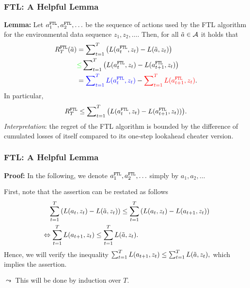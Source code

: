 \begin{frame} 
	\frametitle{FTL: A Helpful Lemma}
	\small
	 \textbf{Lemma:}
		Let $a_1^{\texttt{FTL}}, a_2^{\texttt{FTL}}, \ldots$ be the sequence of actions used by the FTL algorithm for the environmental data sequence $z_1,z_2,\ldots .$
		 Then, for all $\tilde a \in \mathcal{A}$ it holds that 
		\begin{align*}
			R_T^{\FTL}(\tilde a) 
			&= \sum\nolimits_{t=1}^T \left(\l(a_t^{\FTL},z_t) - \l(\tilde a,z_t)\right) \\
%			
			& {\color{green} \leq} \sum\nolimits_{t=1}^T \left(\l(a_t^{\FTL},z_t) - \l(a_{t+1}^{\FTL},z_t)\right)\\
%			
			&= {\color{blue} \sum\nolimits_{t=1}^T \l(a_t^{\FTL},z_t) }-  {\color{red}\sum\nolimits_{t=1}^T  \l(a_{t+1}^{\FTL},z_t)}.
		\end{align*}
		 In particular,
		\begin{equation*}
			R_T^{\texttt{FTL}} \leq \sum\nolimits_{t=1}^T \big(L(a_t^{\texttt{FTL}},z_t) - L(a_{t+1}^{\texttt{FTL}},z_t))\big).
		\end{equation*}
		 \emph{Interpretation}: the regret of the FTL algorithm is {\color{green}bounded} by {\color{blue} the difference of cumulated losses of itself} compared to {\color{red} its one-step lookahead cheater version}.
\end{frame}

\begin{frame} 
	\frametitle{FTL: A Helpful Lemma}
	\small
		\textbf{Proof:}
		In the following, we denote  $a_1^{\texttt{FTL}}, a_2^{\texttt{FTL}}, \ldots$  simply by  $a_1, a_2, \ldots$  	
		
		 First, note that the assertion can be restated as follows
		\begin{equation*}
			\begin{split}
				&\quad \sum\limits_{t=1}^T \left(L(a_t,z_t) - L(\tilde a,z_t)\right) \leq \sum\limits_{t=1}^T \left(L(a_t,z_t) - L(a_{t+1},z_t)\right) \\
				 &\Leftrightarrow \sum\limits_{t=1}^T L(a_{t+1},z_t) \leq  \sum\limits_{t=1}^T L(\tilde a,z_t).
			\end{split} 
		\end{equation*}
		 Hence, we will verify the inequality $\sum\nolimits_{t=1}^T L(a_{t+1},z_t) \leq  \sum\nolimits_{t=1}^T L(\tilde a,z_t),$ which implies the assertion.
		 \lz
		 
		 $\leadsto$ This will be done  by induction over $T$.
\end{frame}

